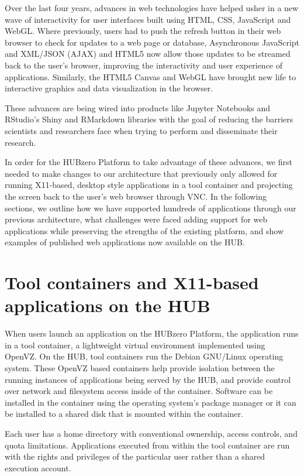 \documentclass[conference]{../sty/IEEEtran}
\begin{document}
Over the last four years, advances in web technologies have helped usher in a
new wave of interactivity for user interfaces built using HTML, CSS, JavaScript
and WebGL. Where previously, users had to push the refresh button in their web
browser to check for updates to a web page or database, Asynchronous JavaScript
and XML/JSON (AJAX) and HTML5 now allow those updates to be streamed back to
the user's browser, improving the interactivity and user experience of
applications. Similarly, the HTML5 Canvas and WebGL have brought new life to
interactive graphics and data visualization in the browser.

These advances are being wired into products like Jupyter Notebooks
\cite{jupyter} and RStudio's Shiny and RMarkdown libraries \cite{rstudio} with
the goal of reducing the barriers scientists and researchers face when trying
to perform and disseminate their research.

In order for the HUBzero Platform to take advantage of these advances, we first
needed to make changes to our architecture that previously only allowed for
running X11-based, desktop style applications in a tool container and
projecting the screen back to the user's web browser through VNC. In the
following sections, we outline how we have supported hundreds of applications
through our previous architecture, what challenges were faced adding support
for web applications while preserving the strengths of the existing platform,
and show examples of published web applications now available on the HUB.


\section{Tool containers and X11-based applications on the HUB}


When users launch an application on the HUBzero Platform, the application runs
in a tool container, a lightweight virtual environment implemented using
OpenVZ\cite{openvz}. On the HUB, tool containers run the Debian GNU/Linux
operating system. These OpenVZ based containers help provide isolation between
the running instances of applications being served by the HUB, and provide
control over network and filesystem access inside of the container. Software
can be installed in the container using the operating system's package manager
or it can be installed to a shared disk that is mounted within the container.

Each user has a home directory with conventional ownership, access controls,
and quota limitations. Applications executed from within the tool container are
run with the rights and privileges of the particular user rather than a shared
execution account.
\end{document}
